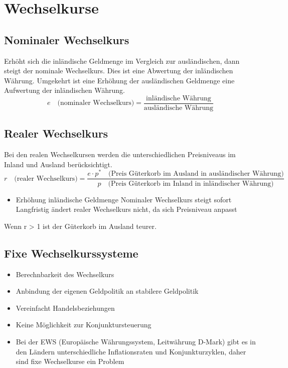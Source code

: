 \section{Wechselkurse}
\subsection{Nominaler Wechselkurs}
Erhöht sich die inländische Geldmenge im Vergleich zur ausländischen, dann steigt der nominale Wechselkurs. Dies ist eine Abwertung der inländischen Währung. Umgekehrt ist eine Erhöhung der ausländischen Geldmenge eine Aufwertung der inländischen Währung. 
\begin{equation*}
 e\quad\text{(nominaler Wechselkurs)} = \frac{\text{inländische  Währung}}{\text{ausländische Währung}}
\end{equation*}
\subsection{Realer Wechselkurs}
Bei den realen Wechselkursen werden die unterschiedlichen Preisniveaus im Inland und Ausland berücksichtigt.
\begin{equation*}
	r\quad \text{(realer Wechselkurs)} = \frac{e \cdot p^{*}\quad \text{(Preis Güterkorb  im Ausland in  ausländischer  Währung)}}{p\quad \text{(Preis\ Güterkorb im Inland in inländischer Währung})}
\end{equation*}
\begin{itemize}
	\item Erhöhung inländische Geldmenge
	\subitem Nominaler Wechselkurs steigt sofort
	\subitem Langfristig ändert realer Wechselkurs nicht, da sich Preisniveau anpasst
\end{itemize}

Wenn r > 1 ist der Güterkorb im Ausland teurer.
\clearpage
\pagebreak
\subsection{Fixe Wechselkurssysteme}
\begin{itemize}
	\item Berechnbarkeit des Wechselkurs
	\item Anbindung der eigenen Geldpolitik an stabilere Geldpolitik
	\item Vereinfacht Handelsbeziehungen
	\item Keine Möglichkeit zur Konjunktursteuerung
	\item Bei der EWS (Europäische Währungssystem, Leitwährung D-Mark) gibt es in den Ländern unterschiedliche Inflationsraten und Konjunkturzyklen, daher sind fixe Wechselkurse ein Problem
\end{itemize}
